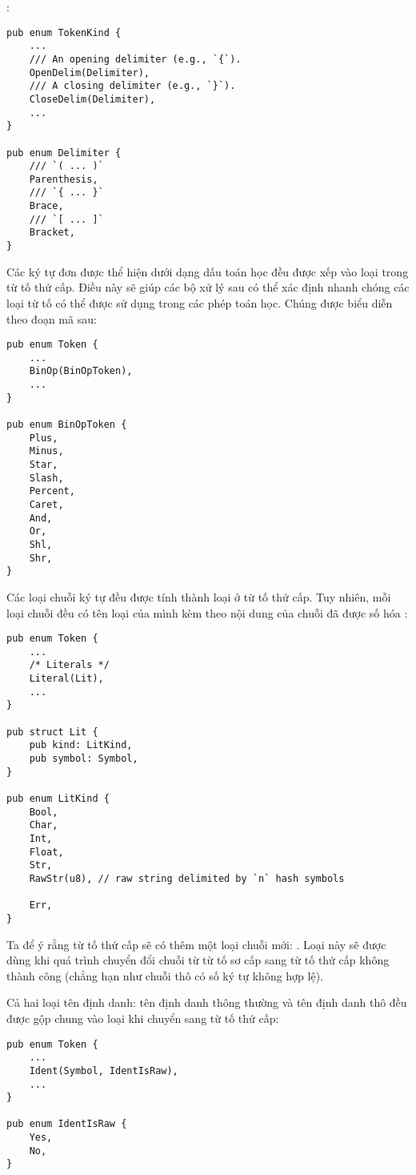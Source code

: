 \noindent {}:
\begin{lstlisting}[]
pub enum TokenKind {
    ...
    /// An opening delimiter (e.g., `{`).
    OpenDelim(Delimiter),
    /// A closing delimiter (e.g., `}`).
    CloseDelim(Delimiter),
    ...
}

pub enum Delimiter {
    /// `( ... )`
    Parenthesis,
    /// `{ ... }`
    Brace,
    /// `[ ... ]`
    Bracket,
}
\end{lstlisting}

    Các ký tự đơn được thể hiện dưới dạng dấu toán học đều được xếp vào loại  trong từ tố thứ cấp. Điều này sẽ giúp các bộ xử lý sau có thể xác định nhanh chóng các loại từ tố có thể được sử dụng trong các phép toán học. Chúng được biểu diễn theo đoạn mã sau:

\begin{lstlisting}[]
pub enum Token {
    ...
    BinOp(BinOpToken),
    ...
}

pub enum BinOpToken {
    Plus,
    Minus,
    Star,
    Slash,
    Percent,
    Caret,
    And,
    Or,
    Shl,
    Shr,
}
\end{lstlisting}

Các loại chuỗi ký tự đều được tính thành loại  ở từ tố thứ cấp. Tuy nhiên, mỗi loại chuỗi đều có tên loại của mình  kèm theo nội dung của chuỗi đã được số hóa :

\begin{lstlisting}[]
pub enum Token {
    ...
    /* Literals */
    Literal(Lit),
    ...
}

pub struct Lit {
    pub kind: LitKind,
    pub symbol: Symbol,
}

pub enum LitKind {
    Bool,
    Char,
    Int,
    Float,
    Str,
    RawStr(u8), // raw string delimited by `n` hash symbols

    Err,
}
\end{lstlisting}

    Ta để ý rằng từ tố thứ cấp sẽ có thêm một loại chuỗi mới: . Loại này sẽ được dùng khi quá trình chuyển đổi chuỗi từ từ tố sơ cấp sang từ tố thứ cấp không thành công (chẳng hạn như chuỗi thô có số ký tự \kw{\#} không hợp lệ).

    Cả hai loại tên định danh: tên định danh thông thường và tên định danh thô đều được gộp chung vào loại  khi chuyển sang từ tố thứ cấp:

\begin{lstlisting}[]
pub enum Token {
    ...
    Ident(Symbol, IdentIsRaw),
    ...
}

pub enum IdentIsRaw {
    Yes,
    No,
}
\end{lstlisting}


